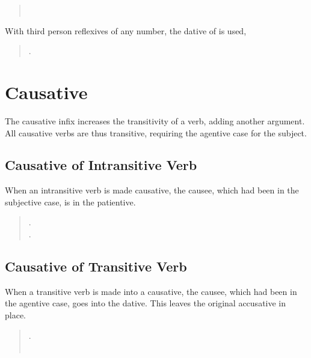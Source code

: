 \begin{quotation}
\noindent{}  \\
\noindent{} 
\end{quotation}

\noindent With third person reflexives of any number, the dative of
 is used,

\begin{quotation}
\noindent{} .
\end{quotation}

\noindent {}

\section{Causative}
\noindent The causative infix  increases the transitivity
of a verb, adding another argument.  All causa\-tive verbs are thus
transitive, requiring the agentive case for the subject.
\label{syn:causative}

\subsection{Causative of Intransitive Verb} When an intransitive verb
is made causative, the causee, which had been in the subjective case,
is in the patientive.

\begin{quotation}
\noindent{} .\\
\noindent{} .
\end{quotation}

\subsection{Causative of Transitive Verb} When a transitive verb is
made into a causative, the causee, which had been in the agentive
case, goes into the dative.  This leaves the original accus\-at\-ive in
place.  \label{syn:trans-causative}

\begin{quotation}
\noindent{} .\\
\noindent{}\\
\indent {} 
\end{quotation}

